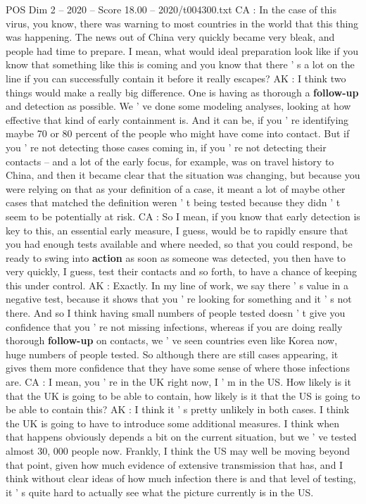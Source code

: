 \begin{textsample}{POS Dim 2 – 2020 – Score 18.00 – 2020/t004300.txt}
CA : In the case of this virus, you know, there was warning to most countries in the world that this thing was happening.
The news out of China very quickly became very bleak, and people had time to prepare.
I mean, what would ideal preparation look like if you know that something like this is coming and you know that there ' s a lot on the line if you can successfully contain it before it really escapes?
AK : I think two things would make a really big difference.
One is having as thorough a \textbf{follow-up} and detection as possible.
We ' ve done some modeling analyses, looking at how effective that kind of early containment is.
And it can be, if you ' re identifying maybe 70 or 80 percent of the people who might have come into contact.
But if you ' re not detecting those cases coming in, if you ' re not detecting their contacts -- and a lot of the early focus, for example, was on travel history to China, and then it became clear that the situation was changing, but because you were relying on that as your definition of a case, it meant a lot of maybe other cases that matched the definition weren ' t being tested because they didn ' t seem to be potentially at risk.
CA : So I mean, if you know that early detection is key to this, an essential early measure, I guess, would be to rapidly ensure that you had enough tests available and where needed, so that you could respond, be ready to swing into \textbf{action} as soon as someone was detected, you then have to very quickly, I guess, test their contacts and so forth, to have a chance of keeping this under control.
AK : Exactly.
In my line of work, we say there ' s value in a negative test, because it shows that you ' re looking for something and it ' s not there.
And so I think having small numbers of people tested doesn ' t give you confidence that you ' re not missing infections, whereas if you are doing really thorough \textbf{follow-up} on contacts, we ' ve seen countries even like Korea now, huge numbers of people tested.
So although there are still cases appearing, it gives them more confidence that they have some sense of where those infections are.
CA : I mean, you ' re in the UK right now, I ' m in the US.
How likely is it that the UK is going to be able to contain, how likely is it that the US is going to be able to contain this?
AK : I think it ' s pretty unlikely in both cases.
I think the UK is going to have to introduce some additional measures.
I think when that happens obviously depends a bit on the current situation, but we ' ve tested almost 30, 000 people now.
Frankly, I think the US may well be moving beyond that point, given how much evidence of extensive transmission that has, and I think without clear ideas of how much infection there is and that level of testing, it ' s quite hard to actually see what the picture currently is in the US.

\end{textsample}
